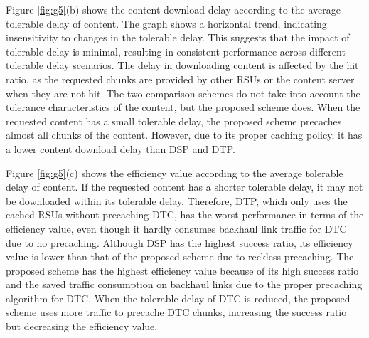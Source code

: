 \documentclass[journal]{IEEEtran}
\begin{document}
Figure \ref{fig:g5}(b) shows the content download delay according to the average tolerable delay of content.
The graph shows a horizontal trend, indicating insensitivity to changes in the tolerable delay.
This suggests that the impact of tolerable delay is minimal, resulting in consistent performance across different tolerable delay scenarios.
The delay in downloading content is affected by the hit ratio, as the requested chunks are provided by other RSUs or the content server when they are not hit.
The two comparison schemes do not take into account the tolerance characteristics of the content, but the proposed scheme does.
When the requested content has a small tolerable delay, the proposed scheme precaches almost all chunks of the content.
However, due to its proper caching policy, it has a lower content download delay than DSP and DTP.

Figure \ref{fig:g5}(c) shows the efficiency value according to the average tolerable delay of content.
If the requested content has a shorter tolerable delay, it may not be downloaded within its tolerable delay.
Therefore, DTP, which only uses the cached RSUs without precaching DTC, has the worst performance in terms of the efficiency value, even though it hardly consumes backhaul link traffic for DTC due to no precaching.
Although DSP has the highest success ratio, its efficiency value is lower than that of the proposed scheme due to reckless precaching.
The proposed scheme has the highest efficiency value because of its high success ratio and the saved traffic consumption on backhaul links due to the proper precaching algorithm for DTC.
When the tolerable delay of DTC is reduced, the proposed scheme uses more traffic to precache DTC chunks, increasing the success ratio but decreasing the efficiency value.
\end{document}

